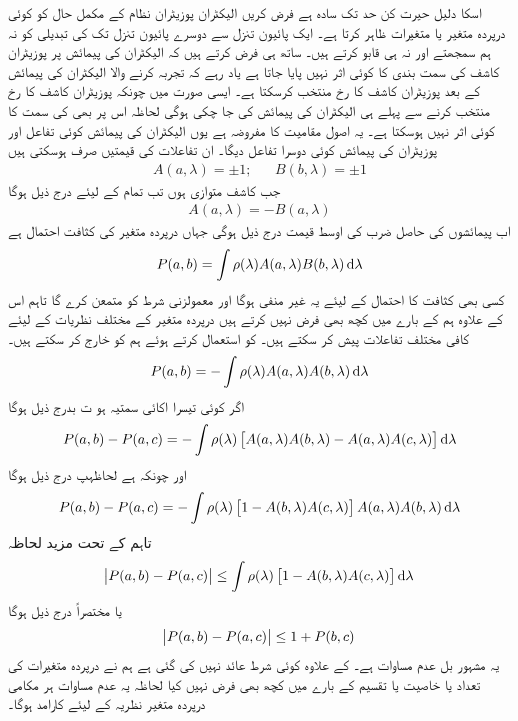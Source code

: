 اسکا دلیل حیرت کن حد تک سادہ ہے فرض کریں الیکٹران پوزیٹران نظام کے مکمل حال کو کوئی درپردہ متغیر یا متغیرات  ظاہر کرتا ہے۔ ایک پائیون تنزل سے دوسرے پائیون تنزل تک  کی تبدیلی کو نہ ہم سمجھتے اور نہ ہی قابو کرتے ہیں۔ ساتھ ہی فرض کرتے ہیں کہ الیکٹران کی پیمائش پر پوزیٹران کاشف کی سمت بندی  کا کوئی اثر نہیں پایا جاتا ہے یاد رہے کہ تجربہ کرنے والا الیکٹران کی پیمائش کے بعد پوزیٹران کاشف کا رخ منتخب کرسکتا ہے۔ ایسی صورت میں چونکہ پوزیٹران کاشف کا رخ منتخب کرنے سے پہلے ہی الیکٹران کی پیمائش کی جا چکی ہوگی لحاظہ اس پر بھی کی سمت کا کوئی اثر نہیں ہوسکتا ہے۔ یہ اصول مقامیت کا مفروضہ ہے یوں الیکٹران کی پیمائش کوئی تفاعل  اور پوزیٹران کی پیمائش کوئی دوسرا تفاعل  دیگا۔ ان تفاعلات کی قیمتیں صرف  ہوسکتی ہیں
\begin{align}
	A(a, \lambda) = \pm1; && B(b, \lambda) = \pm1
\end{align}
جب کاشف متوازی ہوں تب تمام  کے لیئے درج ذیل ہوگا 
\begin{align}
	A(a, \lambda) = -B(a, \lambda)
\end{align}
اب پیمائشوں کی حاصل ضرب کی اوسط قیمت درج ذیل ہوگی جہاں  درپردہ متغیر کی کثافت احتمال ہے
\begin{align}
	P(a, b) = \int\rho(\lambda)A(a, \lambda)B(b, \lambda)\dif\lambda
\end{align}
کسی بھی کثافت کا احتمال کے لیئے یہ غیر منفی ہوگا اور معمولزنی شرط  کو متمعن کرے گا تاہم اس کے علاوہ ہم  کے بارے میں کچھ بھی فرض نہیں کرتے ہیں درپردہ متغیر کے مختلف نظریات  کے لیئے کافی مختلف تفاعلات پیش کر سکتے ہیں۔  کو استعمال کرتے ہوئے ہم  کو خارج کر سکتے ہیں۔
\begin{align}
	P(a, b) = -\int\rho(\lambda)A(a, \lambda)A(b, \lambda)\dif\lambda
\end{align}
اگر  کوئی تیسرا اکائی سمتیہ ہو ت بدرج ذیل ہوگا
\begin{align}
	P(a, b)-P(a, c) = -\int\rho(\lambda)\left[A(a, \lambda)A(b, \lambda)-A(a, \lambda)A(c, \lambda)\right]\dif\lambda
\end{align}
اور چونکہ  ہے لحاظہپ درج ذیل ہوگا 
\begin{align}
	P(a, b)-P(a, c) =-\int\rho(\lambda)\left[1-A(b, \lambda)A(c, \lambda)\right]A(a, \lambda)A(b, \lambda)\dif\lambda
\end{align}
تاہم  کے تحت  مزید  لحاظہ 
\begin{align}
	\abs{P(a, b)-P(a,c)}\leq\int\rho(\lambda)\left[1-A(b, \lambda)A(c, \lambda)\right]\dif\lambda
\end{align}
یا مختصراً درج ذیل ہوگا
\begin{align}
	\abs{P(a, b)-P(a, c)}\leq1+P(b, c)
\end{align}
یہ مشہور بل عدم مساوات ہے۔  کے علاوہ کوئی شرط عائد نہیں کی گئی ہے ہم نے درپردہ متغیرات کی تعداد یا خاصیت یا تقسیم  کے بارے میں کچھ بھی فرض نہیں کیا لحاظہ یہ عدم مساوات ہر مکامی درپردہ متغیر نظریہ کے لیئے کارامد ہوگا۔

